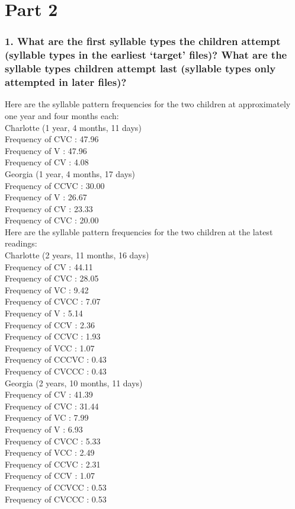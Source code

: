 \documentclass[a4paper,10pt]{article}
\newcommand{\br}{\\[10pt]}
\begin{document}
  \section*{Part 2}

  \subsubsection*{1. What are the first syllable types the children attempt (syllable types in the earliest ‘target’ files)? What are the syllable types children attempt last (syllable types only attempted in later files)?}
  Here are the syllable pattern frequencies for the two children at approximately one year and four months each:
  \br
  Charlotte (1 year, 4 months, 11 days)\\
  Frequency of CVC :        47.96\\
  Frequency of V :          47.96\\
  Frequency of CV :          4.08
  \br
  Georgia (1 year, 4 months, 17 days)\\
  Frequency of CCVC :       30.00\\
  Frequency of V :          26.67\\
  Frequency of CV :         23.33\\
  Frequency of CVC :        20.00
  \br
  Here are the syllable pattern frequencies for the two children at the latest readings:
  \br
  Charlotte (2 years, 11 months, 16 days)\\
  Frequency of CV :         44.11\\
  Frequency of CVC :        28.05\\
  Frequency of VC :          9.42\\
  Frequency of CVCC :        7.07\\
  Frequency of V :           5.14\\
  Frequency of CCV :         2.36\\
  Frequency of CCVC :        1.93\\
  Frequency of VCC :         1.07\\
  Frequency of CCCVC :       0.43\\
  Frequency of CVCCC :       0.43
  \br
  Georgia (2 years, 10 months, 11 days)\\
  Frequency of CV :         41.39\\
  Frequency of CVC :        31.44\\
  Frequency of VC :          7.99\\
  Frequency of V :           6.93\\
  Frequency of CVCC :        5.33\\
  Frequency of VCC :         2.49\\
  Frequency of CCVC :        2.31\\
  Frequency of CCV :         1.07\\
  Frequency of CCVCC :       0.53\\
  Frequency of CVCCC :       0.53
\end{document}
